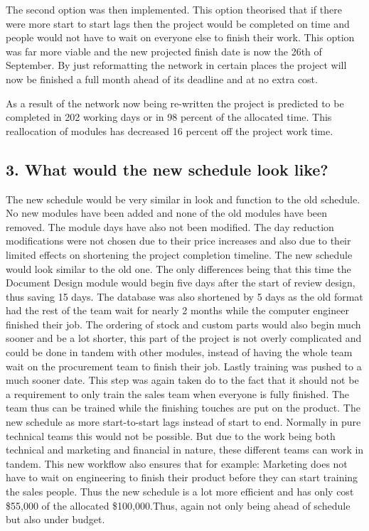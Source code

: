 \documentclass{article}
\begin{document}
The second option was then implemented. This option theorised that if there were more start to start lags then the project would be completed on time and people would not have to wait on everyone else to finish their work. This option was far more viable and the new projected finish date is now the 26th of September. By just reformatting the network in certain places the project will now be finished a full month ahead of its deadline and at no extra cost.





As a result of the network now being re-written the project is predicted to be completed in 202 working days or in 98 percent of the allocated time. This reallocation of modules has decreased 16 percent off the project work time.



\subsection{3. What would the new schedule look like? }




The new schedule would be very similar in look and function to the old schedule. No new modules have been added and none of the old modules have been removed. The module days have also not been modified. The day reduction modifications were not chosen due to their price increases and also due to their limited effects on shortening the project completion timeline.
The new schedule would look similar to the old one. The only differences being that this time the Document Design module would begin five days after the start of review design, thus saving 15 days.
The database was also shortened by 5 days as the old format had the rest of the team wait for nearly 2 months while the computer engineer finished their job.
 The ordering of stock and custom parts would also begin much sooner and be a lot shorter, this part of the project is not overly complicated and could be done in tandem with other modules, instead of having the whole team wait on the procurement team to finish their job.
Lastly training was pushed to a much sooner date. This step was again taken do to the fact that it should not be a requirement to only train the sales team when everyone is fully finished. The team thus can be trained while the finishing touches are put on the product.
The new schedule as more start-to-start lags instead of start to end. Normally in pure technical teams this would not be possible. But due to the work being both technical and marketing and financial in nature, these different teams can work in tandem. This new workflow also ensures that for example: Marketing does not have to wait on engineering to finish their product before they can start training the sales people. 
Thus the new schedule is a lot more efficient and has only cost \$55,000 of the allocated \$100,000.Thus, again not only being ahead of schedule but also under budget. 
\end{document}
